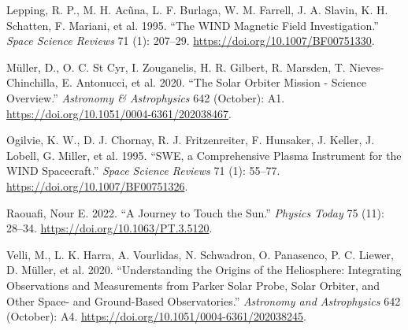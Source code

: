 \documentclass[
  letterpaper,
  DIV=11,
  numbers=noendperiod,
  oneside]{scrartcl}
\newlength{\cslhangindent}
\newenvironment{CSLReferences}[2] %
 {\begin{list}{}{%
  \setlength{\itemindent}{0pt}
  \setlength{\leftmargin}{0pt}
  \setlength{\parsep}{0pt}
  \ifodd #1
   \setlength{\leftmargin}{\cslhangindent}
   \setlength{\itemindent}{-1\cslhangindent}
  \fi
  \setlength{\itemsep}{#2\baselineskip}}}
 {\end{list}}
\begin{document}
\begin{CSLReferences}{1}{0}
Lepping, R. P., M. H. Acũna, L. F. Burlaga, W. M. Farrell, J. A. Slavin,
K. H. Schatten, F. Mariani, et al. 1995. {``The WIND Magnetic Field
Investigation.''} \emph{Space Science Reviews} 71 (1): 207--29.
\url{https://doi.org/10.1007/BF00751330}.

Müller, D., O. C. St Cyr, I. Zouganelis, H. R. Gilbert, R. Marsden, T.
Nieves-Chinchilla, E. Antonucci, et al. 2020. {``The Solar Orbiter
Mission - Science Overview.''} \emph{Astronomy \& Astrophysics} 642
(October): A1. \url{https://doi.org/10.1051/0004-6361/202038467}.

Ogilvie, K. W., D. J. Chornay, R. J. Fritzenreiter, F. Hunsaker, J.
Keller, J. Lobell, G. Miller, et al. 1995. {``SWE, a Comprehensive
Plasma Instrument for the WIND Spacecraft.''} \emph{Space Science
Reviews} 71 (1): 55--77. \url{https://doi.org/10.1007/BF00751326}.

Raouafi, Nour E. 2022. {``A Journey to Touch the Sun.''} \emph{Physics
Today} 75 (11): 28--34. \url{https://doi.org/10.1063/PT.3.5120}.

Velli, M., L. K. Harra, A. Vourlidas, N. Schwadron, O. Panasenco, P. C.
Liewer, D. Müller, et al. 2020. {``Understanding the Origins of the
Heliosphere: Integrating Observations and Measurements from Parker Solar
Probe, Solar Orbiter, and Other Space- and Ground-Based
Observatories.''} \emph{Astronomy and Astrophysics} 642 (October): A4.
\url{https://doi.org/10.1051/0004-6361/202038245}.

\end{CSLReferences}
\end{document}
